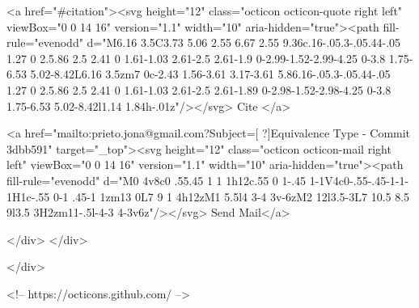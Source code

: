       <a  href="#citation"><svg height="12" class="octicon octicon-quote right left" viewBox="0 0 14 16" version="1.1" width="10" aria-hidden="true"><path fill-rule="evenodd" d="M6.16 3.5C3.73 5.06 2.55 6.67 2.55 9.36c.16-.05.3-.05.44-.05 1.27 0 2.5.86 2.5 2.41 0 1.61-1.03 2.61-2.5 2.61-1.9 0-2.99-1.52-2.99-4.25 0-3.8 1.75-6.53 5.02-8.42L6.16 3.5zm7 0c-2.43 1.56-3.61 3.17-3.61 5.86.16-.05.3-.05.44-.05 1.27 0 2.5.86 2.5 2.41 0 1.61-1.03 2.61-2.5 2.61-1.89 0-2.98-1.52-2.98-4.25 0-3.8 1.75-6.53 5.02-8.42l1.14 1.84h-.01z"/></svg> Cite
      </a>

      <a href="mailto:prieto.jona@gmail.com?Subject=[ ?]Equivalence Type - Commit 3dbb591" target="_top"><svg height="12" class="octicon octicon-mail right left" viewBox="0 0 14 16" version="1.1" width="10" aria-hidden="true"><path fill-rule="evenodd" d="M0 4v8c0 .55.45 1 1 1h12c.55 0 1-.45 1-1V4c0-.55-.45-1-1-1H1c-.55 0-1 .45-1 1zm13 0L7 9 1 4h12zM1 5.5l4 3-4 3v-6zM2 12l3.5-3L7 10.5 8.5 9l3.5 3H2zm11-.5l-4-3 4-3v6z"/></svg> Send Mail</a>

    </div>
  </div>

</div>

<!-- https://octicons.github.com/ -->






